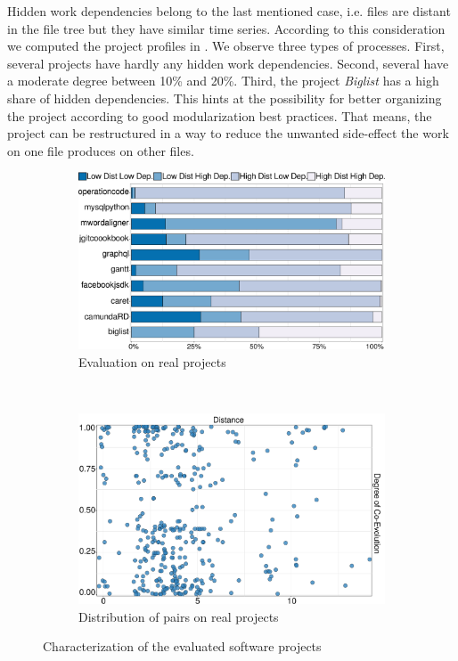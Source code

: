 Hidden work dependencies belong to the last mentioned case, i.e. files are distant in the file tree but they have similar time series. According to this consideration we computed the project profiles in . We observe three types of processes. First, several projects have hardly any hidden work dependencies. Second, several have a moderate degree between 10\% and 20\%. Third, the project \textit{Biglist} has a high share of hidden dependencies. This hints at the possibility for better organizing the project according to good modularization best practices. That means, the project can be restructured in a way to reduce the unwanted side-effect the work on one file produces on other files.
%


\begin{figure}[t]
	\begin{subfigure}[b]{.51\textwidth}
		\centering
		\includegraphics[width=.98\linewidth]{bpm2017/figures/Project-Analysis-Barchart-crop.pdf}
		\caption{Evaluation on real projects}
		\label{fig:project-analysis}
	\end{subfigure}~
	\begin{subfigure}[b]{.47\textwidth}
		\centering
		\includegraphics[width=.98\linewidth]{bpm2017/figures/Co-EvolutionVSDistance-OneColor.pdf}
		\caption{Distribution of pairs on real projects}
		\label{fig:pairs-on-space}
	\end{subfigure}
	\caption{Characterization of the evaluated software projects}
\end{figure}
